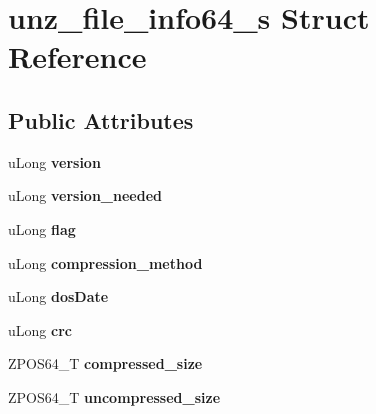 \hypertarget{structunz__file__info64__s}{\section{unz\-\_\-file\-\_\-info64\-\_\-s Struct Reference}
\label{structunz__file__info64__s}
}
\subsection*{Public Attributes}
\begin{DoxyCompactItemize}
\item 
\hypertarget{structunz__file__info64__s_a4262e51be02716b887447e68c231006b}{u\-Long {\bfseries version}}\label{structunz__file__info64__s_a4262e51be02716b887447e68c231006b}

\item 
\hypertarget{structunz__file__info64__s_ad0041eacba37cb431242d9bd9c86d264}{u\-Long {\bfseries version\-\_\-needed}}\label{structunz__file__info64__s_ad0041eacba37cb431242d9bd9c86d264}

\item 
\hypertarget{structunz__file__info64__s_a9432647db394dbfd2a415d6c1184db92}{u\-Long {\bfseries flag}}\label{structunz__file__info64__s_a9432647db394dbfd2a415d6c1184db92}

\item 
\hypertarget{structunz__file__info64__s_ac25e6f99bc51d046b8871ddbb4b5f9f7}{u\-Long {\bfseries compression\-\_\-method}}\label{structunz__file__info64__s_ac25e6f99bc51d046b8871ddbb4b5f9f7}

\item 
\hypertarget{structunz__file__info64__s_a96e084f75d7f08f546789a0a4525470f}{u\-Long {\bfseries dos\-Date}}\label{structunz__file__info64__s_a96e084f75d7f08f546789a0a4525470f}

\item 
\hypertarget{structunz__file__info64__s_a3026bf850e727543d9304c8deaf9eb27}{u\-Long {\bfseries crc}}\label{structunz__file__info64__s_a3026bf850e727543d9304c8deaf9eb27}

\item 
\hypertarget{structunz__file__info64__s_afefa321d4008a52a609d437ed4b4e03f}{Z\-P\-O\-S64\-\_\-\-T {\bfseries compressed\-\_\-size}}\label{structunz__file__info64__s_afefa321d4008a52a609d437ed4b4e03f}

\item 
\hypertarget{structunz__file__info64__s_a8cf74465a9d0641cdf1bb22c33f09b42}{Z\-P\-O\-S64\-\_\-\-T {\bfseries uncompressed\-\_\-size}}\label{structunz__file__info64__s_a8cf74465a9d0641cdf1bb22c33f09b42}


\end{DoxyCompactItemize}
